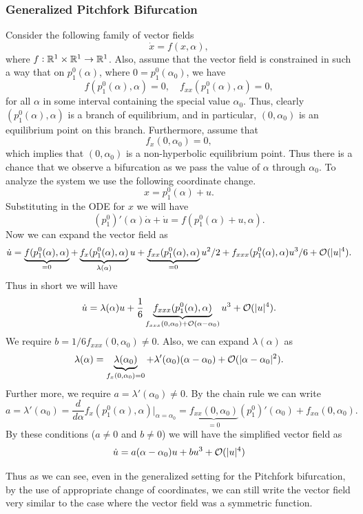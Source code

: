 \subsubsection*{Generalized Pitchfork Bifurcation}
Consider the following family of vector fields
\[ \dot{x} = f(x,\alpha), \]
where $f: \mathbb{R}^1 \times \mathbb{R}^1 \to \mathbb{R}^1$. Also, assume that the vector field is constrained in such a way that on $p^0_1(\alpha)$, where $0 = p^0_1(\alpha_0)$, we have
\[ f(p^0_1(\alpha),\alpha) = 0,\quad f_{xx}(p^0_1(\alpha),\alpha) = 0, \]
for all $\alpha$ in some interval containing the special value $\alpha_0$. Thus, clearly $(p^0_1(\alpha),\alpha)$ is a branch of equilibrium, and in particular, $(0,\alpha_0)$ is an equilibrium point on this branch. Furthermore, assume that 
\[ f_x(0,\alpha_0) = 0, \] 
which implies that $(0,\alpha_0)$ is a non-hyperbolic equilibrium point. Thus there is a chance that we observe a bifurcation as we pass the value of $\alpha$ through $\alpha_0$. To analyze the system we use the following coordinate change.
\[ x = p^0_1(\alpha) + u. \]
Substituting in the ODE for $x$ we will have
\[ (p^0_1)'(\alpha)\dot{\alpha} + \dot{u} = f(p^0_1(\alpha) + u,\alpha).\]
Now we can expand the vector field as
\[ \dot{u} = \underbrace{f(p^0_1(\alpha),\alpha)}_{=0} + \underbrace{f_x(p^0_1(\alpha),\alpha)}_{\lambda(\alpha)}u + \underbrace{f_{xx}(p^0_1(\alpha),\alpha)}_{=0}u^2/2 + f_{xxx}(p^0_1(\alpha),\alpha)u^3/6 + \mathcal{O}(|u|^4). \]
Thus in short we will have
\[ \dot{u} = \lambda(\alpha)u + \frac{1}{6}\underbrace{f_{xxx}(p^0_1(\alpha),\alpha)}_{f_{xxx}(0,\alpha_0) + \mathcal{O}(\alpha-\alpha_0)} u^3 + \mathcal{O}(|u|^4). \]
We require $b = 1/6 f_{xxx}(0,\alpha_0) \neq 0$. Also, we can expand $\lambda(\alpha)$ as
\[ \lambda(\alpha) = \underbrace{\lambda(\alpha_0)}_{f_x(0,\alpha_0)=0} + \lambda'(\alpha_0)(\alpha-\alpha_0) + \mathcal{O}(|\alpha-\alpha_0|^2). \]
Further more, we require $a  = \lambda'(\alpha_0) \neq  0$. By the chain rule we can write
\[  a = \lambda'(\alpha_0) = \frac{d}{d\alpha} f_x(p^0_1(\alpha),\alpha) \big|_{\alpha=\alpha_0} = \underbrace{f_{xx}(0,\alpha_0)}_{=0}(p^0_1)'(\alpha_0) + f_{x\alpha}(0,\alpha_0).  \] 
By these conditions ($a \neq 0$ and $b\neq 0$) we will have the simplified vector field as
\[ \dot{u} = a(\alpha - \alpha_0) u + bu^3 + \mathcal{O}(|u|^4) \]

Thus as we can see, even in the generalized setting for the Pitchfork bifurcation, by the use of appropriate change of coordinates, we can still write the vector field very similar to the case where the vector field was a symmetric function.

